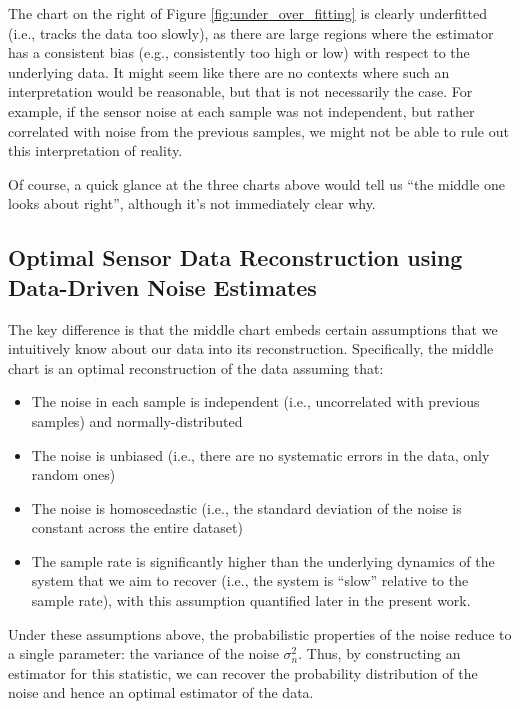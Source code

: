 \documentclass[conf]{new-aiaa}
\begin{document}
    The chart on the right of Figure \ref{fig:under_over_fitting} is clearly underfitted (i.e., tracks the data too slowly), as there are large regions where the estimator has a consistent bias (e.g., consistently too high or low) with respect to the underlying data. It might seem like there are no contexts where such an interpretation would be reasonable, but that is not necessarily the case. For example, if the sensor noise at each sample was not independent, but rather correlated with noise from the previous samples, we might not be able to rule out this interpretation of reality.

    Of course, a quick glance at the three charts above would tell us ``the middle one looks about right'', although it's not immediately clear why.

    \subsection{Optimal Sensor Data Reconstruction using Data-Driven Noise Estimates}
    \label{subsec:optimal_sensor_data_reconstruction}

    The key difference is that the middle chart embeds certain assumptions that we intuitively know about our data into its reconstruction. Specifically, the middle chart is an optimal reconstruction of the data assuming that:

    \begin{itemize}
        \item The noise in each sample is independent (i.e., uncorrelated with previous samples) and normally-distributed
        \item The noise is unbiased (i.e., there are no systematic errors in the data, only random ones)
        \item The noise is homoscedastic (i.e., the standard deviation of the noise is constant across the entire dataset)
        \item The sample rate is significantly higher than the underlying dynamics of the system that we aim to recover (i.e., the system is ``slow'' relative to the sample rate), with this assumption quantified later in the present work.
    \end{itemize}

    Under these assumptions above, the probabilistic properties of the noise reduce to a single parameter: the variance of the noise $\sigma^2_n$. Thus, by constructing an estimator for this statistic, we can recover the probability distribution of the noise and hence an optimal estimator of the data.
\end{document}
